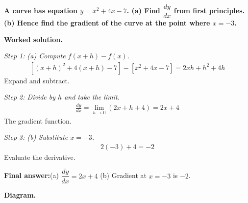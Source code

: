 \documentclass[11pt]{article}
\newcommand{\question}[1]{\par\medskip\noindent\textbf{#1}\par}
\begin{document}
\question{A curve has equation \( y = x^2 + 4x - 7 \). (a) Find \( \dfrac{dy}{dx} \) from first principles. (b) Hence find the gradient of the curve at the point where \( x = -3 \).}

\textbf{Worked solution.}

\textit{Step 1: (a) Compute \( f(x+h) - f(x) \).}
\[\begin{gathered}
[(x+h)^2 + 4(x+h) - 7] - [x^2 + 4x - 7] = 2xh + h^2 + 4h
\end{gathered}\]
Expand and subtract.

\textit{Step 2: Divide by \( h \) and take the limit.}
\[\begin{gathered}
\frac{dy}{dx} = \lim_{h \to 0}(2x + h + 4) = 2x + 4
\end{gathered}\]
The gradient function.

\textit{Step 3: (b) Substitute \( x = -3 \).}
\[\begin{gathered}
2(-3) + 4 = -2
\end{gathered}\]
Evaluate the derivative.

\begin{answerbox}
\textbf{Final answer:}\quad (a) \(\displaystyle  \dfrac{dy}{dx} = 2x + 4 \) \quad  (b) Gradient at \(\displaystyle  x = -3 \) is \(\displaystyle  -2 \).
\end{answerbox}
\textbf{Diagram.}
\end{document}
